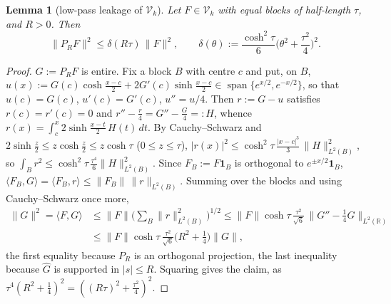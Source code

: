 \documentclass[11pt]{amsart}
\newtheorem{lemma}[theorem]{Lemma}
\theoremstyle{definition}
\theoremstyle{remark}
\newcommand{\R}{\mathbb R}
\begin{document}
\begin{lemma}[low-pass leakage of $\mathcal V_k$]\label{lem:coer-lowpass}
Let $F\in\mathcal V_k$ with equal blocks of half-length $\tau$, and $R>0$. Then
\[
\|P_RF\|^2\le\delta(R\tau)\,\|F\|^2,\qquad \delta(\theta):=\frac{\cosh^2\tau}{6}\Big(\theta^2+\frac{\tau^2}4\Big)^2 .
\]
\end{lemma}
\begin{proof}
$G:=P_RF$ is entire. Fix a block $B$ with centre $c$ and put, on $B$,
$u(x):=G(c)\cosh\frac{x-c}2+2G'(c)\sinh\frac{x-c}2\in\operatorname{span}\{e^{x/2},e^{-x/2}\}$, so that
$u(c)=G(c)$, $u'(c)=G'(c)$, $u''=u/4$. Then $r:=G-u$ satisfies $r(c)=r'(c)=0$ and
$r''-\frac r4=G''-\frac G4=:H$, whence $r(x)=\int_c^x2\sinh\frac{x-t}2\,H(t)\,dt$. By Cauchy--Schwarz and
$2\sinh\frac z2\le z\cosh\frac z2\le z\cosh\tau$ ($0\le z\le\tau$),
$|r(x)|^2\le\cosh^2\tau\,\frac{|x-c|^3}3\,\|H\|_{L^2(B)}^2$, so $\int_Br^2\le\cosh^2\tau\,\frac{\tau^4}6\|H\|_{L^2(B)}^2$.
Since $F_B:=F\mathbf 1_B$ is orthogonal to $e^{\pm x/2}\mathbf 1_B$, $\langle F_B,G\rangle=\langle F_B,r\rangle\le\|F_B\|\,\|r\|_{L^2(B)}$.
Summing over the blocks and using Cauchy--Schwarz once more,
\begin{align*}
\|G\|^2=\langle F,G\rangle&\le\|F\|\Big(\sum_B\|r\|_{L^2(B)}^2\Big)^{1/2}\le\|F\|\cosh\tau\,\frac{\tau^2}{\sqrt6}\,\|G''-\tfrac14G\|_{L^2(\R)}\\
&\le\|F\|\cosh\tau\,\frac{\tau^2}{\sqrt6}\Big(R^2+\frac14\Big)\|G\|,
\end{align*}
the first equality because $P_R$ is an orthogonal projection, the last inequality because
$\widehat G$ is supported in $|s|\le R$. Squaring gives the claim, as $\tau^4(R^2+\frac14)^2=((R\tau)^2+\frac{\tau^2}4)^2$.
\end{proof}
\end{document}
